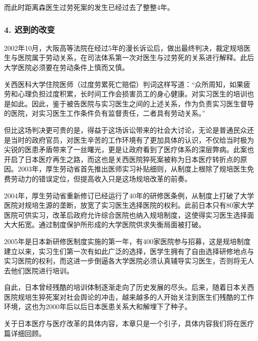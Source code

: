 {\fangsong 而此时距离森医生过劳死案的发生已经过去了整整4年。\par}

\subsubsection{4. 迟到的改变}

{\fangsong 2002年10月，大阪高等法院在经过5年的漫长诉讼后，做出最终判决，裁定规培医生与医院属于劳动关系，在司法体系第一次对医生与过劳死的关系进行解释。此后大学医院必须要在劳动条件上慎而又慎。\par}

{\fangsong 关西医科大学住院医师（过度劳累死亡赔偿）判词这样写道：“众所周知，如果疲劳和心理负担过度积累，长时间工作会损害员工的身心健康。对实习医生的培训也是如此。因此，鉴于被告医院与实习医生之间的上述关系，作为负责实习医生督导的医院，对实习医生工作条件负有监督责任，二者具有劳动关系。”\par}

{\fangsong 但比这场判决更可贵的是，得益于这场诉讼带来的社会大讨论，无论是普通民众还是当时的政府官员，对医生辛苦的工作环境有了更加具体的认识，不仅给当时极为尖锐的医患矛盾带来了一丝曙光，更是让政府看到了医疗体系的深层弊病。此案也开启了日本医疗再生之路，而这也是关西医院猝死案被称为日本医疗转折点的原因。2003年，厚生劳动省首先推出医师实习补贴细则，从制度上根除了规培医生免费劳动力的错误定位，但提高收入只是这场规培改革的前奏。\par}

{\fangsong 2004年，厚生劳动省重新修订已经运行了40年的研修医条例，从制度上打破了大学医院对规培生源的垄断，放宽了实习医生选择医院的权利。此前日本只有80家大学医院可供实习，改革后政府允许综合医院也纳入规培制度，这使得实习医生选择面大大拓宽。通过制度保护所形成的大学医院供求失衡局面被打破。\par}

{\fangsong 2005年是日本新研修医制度实施的第一年，有400家医院参与招募，这是规培制度建立以来，实习生们第一次有如此广泛的选择，医学生拥有了自由选择研修地点与实习医院的权利，而这进一步倒逼各大学医院必须认真辅导实习医生，否则将无人去他们医院进行培训。\par}

{\fangsong 自此，日本曾经残酷的培训体制逐渐走向了历史发展的尽头。后来，随着日本关西医院规培生猝死案对社会舆论的冲击，越来越多的人开始关注到医生们残酷的工作环境，这也为2000年后以后日本医患关系大和解埋下了种子。\par}

{\fangsong 关于日本医疗与医疗改革的具体内容，本章只是一个引子，具体内容我们将在医疗篇详细回顾。\par}
